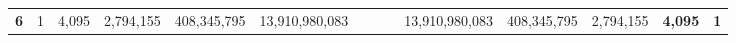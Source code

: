 \begin{table}[h!]
\begin{tabular}{llllccccccclll}
{\color[HTML]{FF0000} \textbf{6}} & \multicolumn{1}{c}{1} & \multicolumn{1}{c}{4,095} & \multicolumn{1}{c}{2,794,155}  & 408,345,795          & 13,910,980,083                     & \multicolumn{1}{l}{}                 & \multicolumn{1}{l}{}                   & \multicolumn{1}{l}{}                    & \cellcolor[HTML]{FCE5CD}13,910,980,083  & \cellcolor[HTML]{CFE2F3}408,345,795 & \multicolumn{1}{c}{\cellcolor[HTML]{FCE5CD}2,794,155} & \multicolumn{1}{c}{\textbf{4,095}} & \multicolumn{1}{c}{\textbf{1}}
\end{tabular}
\end{table}